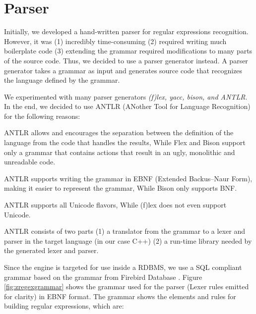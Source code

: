 \section{Parser}\label{section:parser}
Initially, we developed a hand-written parser for regular expressions recognition. However, it was (1) incredibly time-consuming (2) required writing much boilerplate code (3) extending the grammar required modifications to many parts of the source code. Thus, we decided to use a parser generator instead. A parser generator takes a grammar as input and generates source code that recognizes the language defined by the grammar.

We experimented with many parser generators \textit{(f)lex, yacc, bison, and ANTLR}. In the end, we decided to use ANTLR (ANother Tool for Language Recognition) for the following reasons:

\begin{packed_enum}
    \item ANTLR allows and encourages the separation between the definition of the language from the code that handles the results, While Flex and Bison support only a grammar that contains actions that result in an ugly, monolithic and unreadable code.
    \item ANTLR supports writing the grammar in EBNF (Extended Backus–Naur Form), making it easier to represent the grammar, While Bison only supports BNF.
    \item ANTLR supports all Unicode flavors, While (f)lex does not even support Unicode.
\end{packed_enum}

\noindent ANTLR consists of two parts (1) a translator from the grammar to a lexer and parser in the target language (in our case C++) (2) a run-time library needed by the generated lexer and parser.

Since the engine is targeted for use inside a RDBMS, we use a SQL compliant grammar based on the grammar from Firebird Database \cite{2022Firebird}. Figure \ref{fig:zregexgrammar} shows the grammar used for the parser (Lexer rules emitted for clarity) in EBNF format. The grammar shows the elements and rules for building regular expressions, which are:

